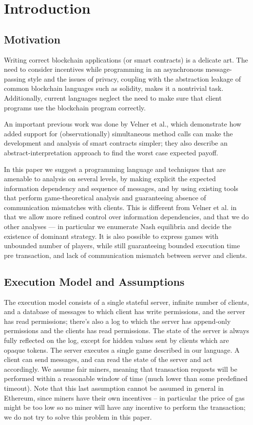 \documentclass[acmsmall,review,anonymous]{acmart}\settopmatter{printfolios=true,printccs=false,printacmref=false}
\begin{document}
\section{Introduction}

\subsection{Motivation}
Writing correct blockchain applications (or smart contracts) is a delicate art. The need to consider incentives while programming in an asynchronous message-passing style and the issues of privacy, coupling with the abstraction leakage of common blockchain languages such as solidity, makes it a nontrivial task. Additionally, current languages neglect the need to make sure that client programs use the blockchain program correctly.

An important previous work was done by Velner et al., which demonstrate how added support for (observationally) simultaneous method calls can make the development and analysis of smart contracts simpler; they also describe an abstract-interpretation approach to find the worst case expected payoff.

In this paper we suggest a programming language and techniques that are amenable to analysis on several levels, by making explicit the expected information dependency and sequence of messages, and by using existing tools that perform game-theoretical analysis and guaranteeing absence of communication mismatches with clients. This is different from Velner et al. in that we allow more refined control over information dependencies, and that we do other analyses --- in particular we enumerate Nash equilibria and decide the existence of dominant strategy. It is also possible to express games with unbounded number of players, while still guaranteeing bounded execution time pre transaction, and lack of communication mismatch between server and clients.

\subsection{Execution Model and Assumptions}
The execution model consists of a single stateful server, infinite number of clients, and a database of messages to which client has write permissions, and the server has read permissions; there's also a log to which the server has append-only permissions and the clients has read permissions. The state of the server is always fully reflected on the log, except for hidden values sent by clients which are opaque tokens. The server executes a single game described in our language. A client can send messages, and can read the state of the server and act accordingly. We assume fair miners, meaning that transaction requests will be performed within a reasonable window of time (much lower than some predefined timeout). Note that this last assumption cannot be assumed in general in Ethereum, since miners have their own incentives -- in particular the price of gas might be too low so no miner will have any incentive to perform the transaction; we do not try to solve this problem in this paper.
\end{document}
